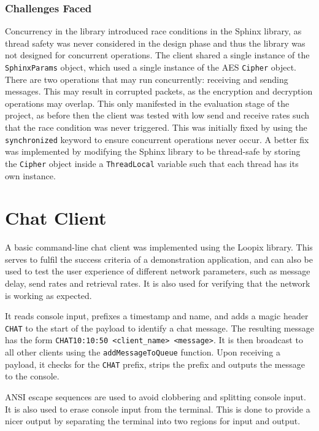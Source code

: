 \documentclass[final,dissertation.tex]{subfiles}
\begin{document}
\subsubsection{Challenges Faced}

Concurrency in the library introduced race conditions in the Sphinx library, as thread safety was never considered in the design phase and thus the library was not designed for concurrent operations. The client shared a single instance of the \verb|SphinxParams| object, which used a single instance of the AES \verb|Cipher| object. There are two operations that may run concurrently: receiving and sending messages. This may result in corrupted packets, as the encryption and decryption operations may overlap. This only manifested in the evaluation stage of the project, as before then the client was tested with low send and receive rates such that the race condition was never triggered. This was initially fixed by using the \verb|synchronized| keyword to ensure concurrent operations never occur. A better fix was implemented by modifying the Sphinx library to be thread-safe by storing the \verb|Cipher| object inside a \verb|ThreadLocal| variable such that each thread has its own instance.

\section{Chat Client}

A basic command-line chat client was implemented using the Loopix library. This serves to fulfil the success criteria of a demonstration application, and can also be used to test the user experience of different network parameters, such as message delay, send rates and retrieval rates. It is also used for verifying that the network is working as expected.

It reads console input, prefixes a timestamp and name, and adds a magic header \verb|CHAT| to the start of the payload to identify a chat message. The resulting message has the form \verb|CHAT10:10:50 <client_name> <message>|. It is then broadcast to all other clients using the \verb|addMessageToQueue| function. Upon receiving a payload, it checks for the \verb|CHAT| prefix, strips the prefix and outputs the message to the console. 

ANSI escape sequences are used to avoid clobbering and splitting console input. It is also used to erase console input from the terminal. This is done to provide a nicer output by separating the terminal into two regions for input and output.
\end{document}
